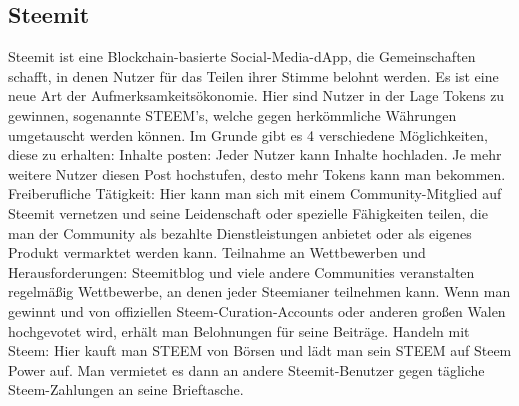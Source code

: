 \subsection{Steemit}
Steemit ist eine Blockchain-basierte Social-Media-dApp, die Gemeinschaften schafft, in denen Nutzer für das Teilen ihrer Stimme belohnt werden. Es ist eine neue Art der Aufmerksamkeitsökonomie.
Hier sind Nutzer in der Lage Tokens zu gewinnen, sogenannte STEEM’s, welche gegen herkömmliche Währungen umgetauscht werden können. Im Grunde gibt es 4 verschiedene Möglichkeiten, diese zu erhalten:
Inhalte posten: Jeder Nutzer kann Inhalte hochladen. Je mehr weitere Nutzer diesen Post hochstufen, desto mehr Tokens kann man bekommen.
Freiberufliche Tätigkeit: Hier kann man sich mit einem Community-Mitglied auf Steemit vernetzen und seine Leidenschaft oder spezielle Fähigkeiten teilen, die man der Community als bezahlte Dienstleistungen anbietet oder als eigenes Produkt vermarktet werden kann.
Teilnahme an Wettbewerben und Herausforderungen: Steemitblog und viele andere Communities veranstalten regelmäßig Wettbewerbe, an denen jeder Steemianer teilnehmen kann. Wenn man gewinnt und von offiziellen Steem-Curation-Accounts oder anderen großen Walen hochgevotet wird, erhält man Belohnungen für seine Beiträge.
Handeln mit Steem: Hier kauft man STEEM von Börsen und lädt man sein STEEM auf Steem Power auf. Man vermietet es dann an andere Steemit-Benutzer gegen tägliche Steem-Zahlungen an seine Brieftasche.
